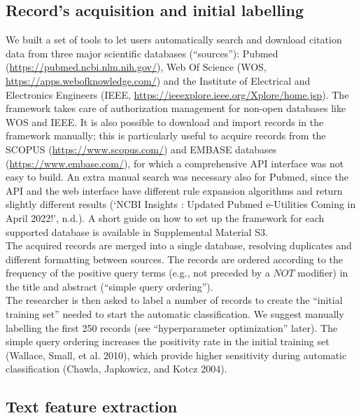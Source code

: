 \documentclass{article}
\begin{document}
\hypertarget{records-acquisition-and-initial-labelling}{%
\subsection{Record's acquisition and initial
labelling}\label{records-acquisition-and-initial-labelling}}

We built a set of tools to let users automatically search and download
citation data from three major scientific databases (``sources''):
Pubmed (\url{https://pubmed.ncbi.nlm.nih.gov/}), Web Of Science (WOS,
\url{https://apps.webofknowledge.com/}) and the Institute of Electrical
and Electronics Engineers (IEEE,
\url{https://ieeexplore.ieee.org/Xplore/home.jsp}). The framework takes
care of authorization management for non-open databases like WOS and
IEEE. It is also possible to download and import records in the
framework manually; this is particularly useful to acquire records from
the SCOPUS (\url{https://www.scopus.com/}) and EMBASE databases
(\url{https://www.embase.com/}), for which a comprehensive API interface
was not easy to build. An extra manual search was necessary also for
Pubmed, since the API and the web interface have different rule
expansion algorithms and return slightly different results ({`NCBI
Insights : Updated Pubmed e-Utilities Coming in April 2022!'}, n.d.). A
short guide on how to set up the framework for each supported database
is available in Supplemental Material S3.\\
The acquired records are merged into a single database, resolving
duplicates and different formatting between sources. The records are
ordered according to the frequency of the positive query terms (e.g.,
not preceded by a \(NOT\) modifier) in the title and abstract (``simple
query ordering'').\\
The researcher is then asked to label a number of records to create the
``initial training set'' needed to start the automatic classification.
We suggest manually labelling the first 250 records (see
``hyperparameter optimization'' later). The simple query ordering
increases the positivity rate in the initial training set (Wallace,
Small, et al. 2010), which provide higher sensitivity during automatic
classification (Chawla, Japkowicz, and Kotcz 2004).

\hypertarget{text-feature-extraction}{%
\subsection{Text feature extraction}\label{text-feature-extraction}}
\end{document}

